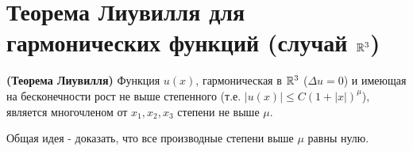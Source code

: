 \section{Теорема Лиувилля для гармонических функций (случай $\mathbb{R}^3$)}


\begin{theorem}

{\bf (Теорема Лиувилля)} Функция $u(x)$, гармоническая в $\mathbb{R}^3$ ($\Delta u = 0$)  и имеющая на бесконечности рост не выше степенного (т.е. $|u(x)| \le C (1+|x|)^{\mu}$), является многочленом от $x_1,x_2,x_3$ степени не выше $\mu$.

\end{theorem}


Общая идея - доказать, что все производные степени выше $\mu$ равны нулю.



